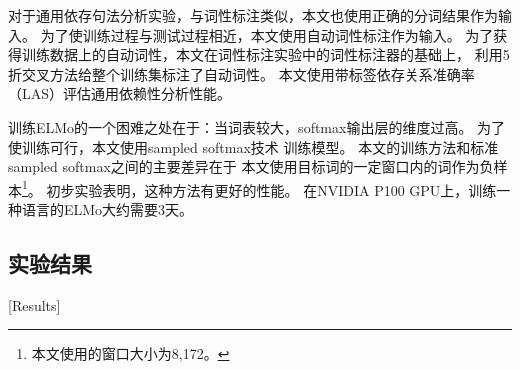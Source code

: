 对于通用依存句法分析实验，与词性标注类似，本文也使用正确的分词结果作为输入。
为了使训练过程与测试过程相近，本文使用自动词性标注作为输入。
为了获得训练数据上的自动词性，本文在词性标注实验中的词性标注器的基础上，
利用5折交叉方法给整个训练集标注了自动词性。
本文使用带标签依存关系准确率（LAS）评估通用依赖性分析性能。

训练ELMo的一个困难之处在于：当词表较大，softmax输出层的维度过高。
为了使训练可行，本文使用sampled softmax技术\cite{jean-EtAl:2015:ACL-IJCNLP}
训练模型。
本文的训练方法和标准sampled softmax之间的主要差异在于
本文使用目标词的一定窗口内的词作为负样本\footnote{本文使用的窗口大小为8,172。}。
初步实验表明，这种方法有更好的性能。
在NVIDIA P100 GPU上，训练一种语言的ELMo大约需要3天。

\subsection{实验结果}[Results]\label{sec:seq:results}
\ltfontsize{\wuhao}
